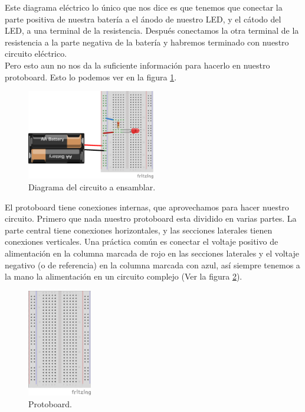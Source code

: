 \documentclass[paper=letter, fontsize=11pt]{scrartcl} %
\numberwithin{equation}{section} %
\numberwithin{figure}{section} %
\numberwithin{table}{section} %
\begin{document}
    Este diagrama eléctrico lo único que nos dice es que tenemos que conectar la parte positiva de nuestra batería a el ánodo de nuestro LED, y el cátodo del LED, a una terminal de la resistencia. Después conectamos la otra terminal de la resistencia a la parte negativa de la batería y habremos terminado con nuestro circuito eléctrico. \\

    Pero esto aun no nos da la suficiente información para hacerlo en nuestro protoboard. Esto lo podemos ver en la figura \ref{dia:cir}. \\

    \begin{figure}[h]
    	\begin{center}
    		\includegraphics[width=0.5\textwidth]{LED-bateria.png} %
    		\caption{Diagrama del circuito a ensamblar.}
    		\label{dia:cir}
    	\end{center}
    \end{figure}

    El protoboard tiene conexiones internas, que aprovechamos para hacer nuestro circuito. Primero que nada nuestro protoboard esta dividido en varias partes. La parte central tiene conexiones horizontales, y las secciones laterales tienen conexiones verticales. Una práctica común es conectar el voltaje positivo de alimentación en la columna marcada de rojo en las secciones laterales y el voltaje negativo (o de referencia) en la columna marcada con azul, así siempre tenemos a la mano la alimentación en un circuito complejo (Ver la figura \ref{dia:proto}). \\

    \begin{figure}[h]
    	\begin{center}
    		\includegraphics[width=0.25\textwidth]{protoboard.png} %
    		\caption{Protoboard.}
    		\label{dia:proto}
    	\end{center}
    \end{figure}
\end{document}
